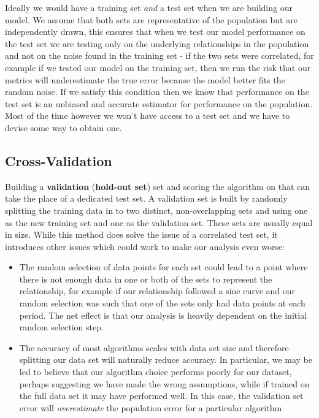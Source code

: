 Ideally we would have a training set \textit{and} a test set when we are building our model. We assume that both sets are representative of the population but are independently drawn, this ensures that when we test our model performance on the test set we are testing only on the underlying relationships in the population and not on the noise found in the training set - if the two sets were correlated, for example if we tested our model on the training set, then we run the risk that our metrics will underestimate the true error because the model better fits the random noise. If we satisfy this condition then we know that performance on the test set is an unbiased and accurate estimator for performance on the population. Most of the time however we won't have access to a test set and we have to devise some way to obtain one.

\subsection{Cross-Validation}

Building a \textbf{validation} (\textbf{hold-out set}) set and scoring the algorithm on that can take the place of a dedicated test set. A validation set is built by randomly splitting the training data in to two distinct, non-overlapping sets and using one as the new training set and one as the validation set. These sets are usually equal in size. While this method does solve the issue of a correlated test set, it introduces other issues which could work to make our analysis even worse:

\begin{itemize}
    \item The random selection of data points for each set could lead to a point where there is not enough data in one or both of the sets to represent the relationship, for example if our relationship followed a sine curve and our random selection was such that one of the sets only had data points at each period. The net effect is that our analysis is heavily dependent on the initial random selection step.
    \item The accuracy of most algorithms scales with data set size and therefore splitting our data set will naturally reduce accuracy. In particular, we may be led to believe that our algorithm choice performs poorly for our dataset, perhaps suggesting we have made the wrong assumptions, while if trained on the full data set it may have performed well. In this case, the validation set error will \textit{overestimate} the population error for a particular algorithm
\end{itemize}

